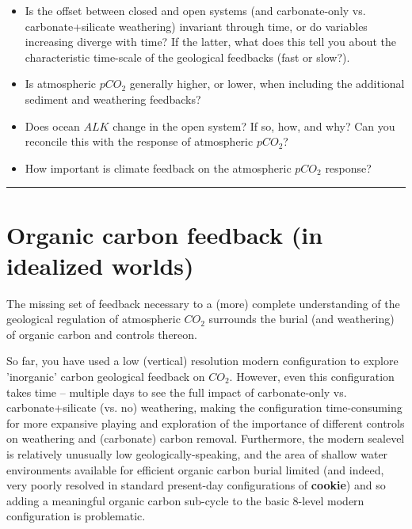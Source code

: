 \vspace{1mm}
\begin{itemize}[noitemsep]
\item Is the offset between closed and open systems (and carbonate-only vs. carbonate+silicate weathering) invariant through time, or do variables increasing diverge with time? If the latter, what does this tell you about the characteristic time-scale of the geological feedbacks (fast or slow?).
\item Is atmospheric $pCO_{2}$ generally higher, or lower, when including the additional sediment and weathering feedbacks?
\item Does ocean $ALK$ change in the open system? If so, how, and why? Can you reconcile this with the response of atmospheric $pCO_{2}$?
\item How important is climate feedback on the atmospheric $pCO_{2}$ response?
\end{itemize}

\vspace{1mm}\noindent\rule{4cm}{0.1mm}\vspace{2mm}

\newpage

\section{Organic carbon feedback (in idealized worlds)}

The missing set of feedback necessary to a (more) complete understanding of the geological regulation of atmospheric $CO_{2}$ surrounds the burial (and weathering) of organic carbon and controls thereon.

So far, you have used a low (vertical) resolution modern configuration to explore 'inorganic' carbon geological feedback on $CO_{2}$. However, even this configuration takes time -- multiple days to see the full impact of carbonate-only vs. carbonate+silicate (vs. no) weathering, making the configuration time-consuming for more expansive playing and exploration of the importance of different controls on weathering and (carbonate) carbon removal. Furthermore, the modern sealevel is relatively unusually low geologically-speaking, and the area of shallow water environments available for efficient organic carbon burial limited (and indeed, very poorly resolved in standard present-day configurations of \textbf{cookie}) and so adding a meaningful organic carbon sub-cycle to the basic 8-level modern configuration is problematic.

